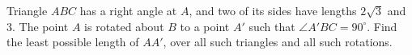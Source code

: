 Triangle $ABC$ has a right angle at $A$, and two of its sides have lengths $2\sqrt3$ and $3$. The point $A$ is rotated about $B$ to a point $A'$ such that $\angle A'BC=90^\circ$. Find the least possible length of $AA'$, over all such triangles and all such rotations.
